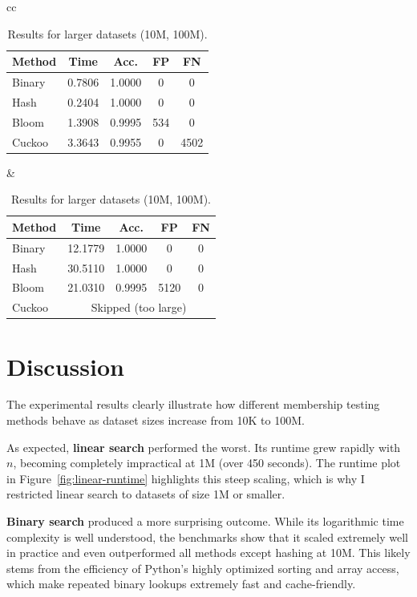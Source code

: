\documentclass[acmsmall]{acmart}
\begin{document}
\begin{table}[h]
\centering
\caption{Results for larger datasets (10M, 100M).}
\label{tab:results-large}
\begin{tabular}{cc}
\begin{minipage}{0.45\linewidth}
\centering
{}\label{tab:results-10M}
\begin{tabular}{lcccc}
\toprule
Method & Time & Acc. & FP & FN \\
\midrule
Binary & 0.7806 & 1.0000 & 0 & 0 \\
Hash   & 0.2404 & 1.0000 & 0 & 0 \\
Bloom  & 1.3908 & 0.9995 & 534 & 0 \\
Cuckoo & 3.3643 & 0.9955 & 0 & 4502 \\
\bottomrule
\end{tabular}
\end{minipage}
&
\begin{minipage}{0.45\linewidth}
\centering
{}\label{tab:results-100M}
\begin{tabular}{lcccc}
\toprule
Method & Time & Acc. & FP & FN \\
\midrule
Binary & 12.1779 & 1.0000 & 0 & 0 \\
Hash   & 30.5110 & 1.0000 & 0 & 0 \\
Bloom  & 21.0310 & 0.9995 & 5120 & 0 \\
Cuckoo & \multicolumn{4}{c}{Skipped (too large)} \\
\bottomrule
\end{tabular}
\end{minipage}
\end{tabular}
\end{table}

\section{Discussion}
The experimental results clearly illustrate how different membership testing methods behave as dataset sizes increase from 10K to 100M.  

As expected, \textbf{linear search} performed the worst. Its runtime grew rapidly with $n$, becoming completely impractical at 1M (over 450 seconds). The runtime plot in Figure~\ref{fig:linear-runtime} highlights this steep scaling, which is why I restricted linear search to datasets of size 1M or smaller.  

\textbf{Binary search} produced a more surprising outcome. While its logarithmic time complexity is well understood, the benchmarks show that it scaled extremely well in practice and even outperformed all methods except hashing at 10M. This likely stems from the efficiency of Python’s highly optimized sorting and array access, which make repeated binary lookups extremely fast and cache-friendly.  
\end{document}
